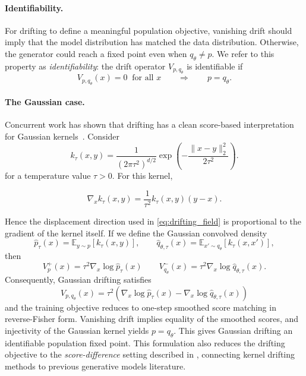 \documentclass{article}
\theoremstyle{plain}
\begin{document}
\paragraph{Identifiability.}
For drifting to define a meaningful population objective, vanishing drift should imply that the model distribution has matched the data distribution. Otherwise, the generator could reach a fixed point even when \(q_\theta \neq p\). We refer to this property as \emph{identifiability}: the drift operator \(V_{p,q_\theta}\) is identifiable if
\begin{equation}
\label{eq:identifiability}
V_{p,q_\theta}(x)=0 \;\; \text{for all } x
\qquad \Longrightarrow \qquad
p=q_\theta.
\end{equation}


\paragraph{The Gaussian case.}
Concurrent work has shown that drifting has a clean score-based interpretation for Gaussian kernels~\cite{Lai_2026_Unified,Turan_2026_Drifting}. Consider
\[
k_\tau(x,y)
=
\frac{1}{(2\pi\tau^2)^{d/2}}\exp\!\left(
-\frac{\|x-y\|_2^2}{2\tau^2}
\right).
\]
for a temperature value $\tau > 0$. For this kernel, 

\[
\nabla_x k_\tau(x,y) =
\frac{1}{\tau^2} k_\tau(x,y)(y-x).\]

Hence the displacement direction used in \eqref{eq:drifting_field} is proportional to the gradient of the kernel itself. If we define the Gaussian convolved density
\[
\widehat{p}_\tau(x) = \mathbb{E}_{y\sim p}\!\left[k_\tau(x,y)\right],  \qquad
 \widehat{q}_{\theta, \tau}(x)
=
\mathbb{E}_{x'\sim q_\theta}\!\left[k_\tau(x,x')\right], 
\]
then
\[
V_{p}^+(x) = \tau^2 \nabla_x \log \widehat{p}_\tau(x)\qquad
 V_{q_\theta}^-(x)= \tau^2 \nabla_x \log \widehat{q}_{\theta, \tau}(x) .
\]
Consequently, Gaussian drifting satisfies
\[
V_{p,q_\theta}(x)
=
\tau^2
\left(
\nabla_x \log \widehat{p}_\tau(x)
-
\nabla_x \log \widehat{q}_{\theta,\tau}(x)
\right)
\]  and the training objective reduces to one-step smoothed score matching in reverse-Fisher form. Vanishing drift implies equality of the smoothed scores, and injectivity of the Gaussian kernel yields \(p=q_\theta\). This gives Gaussian drifting an identifiable population fixed point. This formulation also reduces the drifting objective to the \textit{score-difference} setting described in \citep{weber2023score}, connecting kernel drifting methods to previous generative models literature. 
\end{document}
